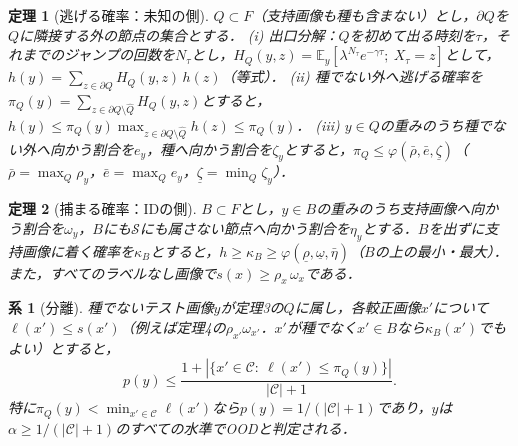 \documentclass[a4paper,10pt,dvipdfmx]{jsarticle}
\newtheorem{theorem}{定理}
\newtheorem{corollary}{系}
\theoremstyle{definition}
\newcommand{\cS}{\mathcal{S}}
\newcommand{\cC}{\mathcal{C}}
\newcommand{\hQ}{\hat{Q}}
\newcommand{\E}{\mathbb{E}}
\begin{document}
\begin{theorem}[逃げる確率：未知の側]
$Q\subset F$（支持画像も種も含まない）とし，$\partial Q$を$Q$に隣接する外の節点の集合とする．
(i) 出口分解：$Q$を初めて出る時刻を$\tau$，それまでのジャンプの回数を$N_\tau$とし，$H_Q(y,z)=\E_y[\lambda^{N_\tau}e^{-\gamma\tau};\ X_\tau=z]$として，$h(y)=\sum_{z\in\partial Q}H_Q(y,z)\,h(z)$（等式）．
(ii) 種でない外へ逃げる確率を$\pi_Q(y)=\sum_{z\in\partial Q\setminus\hQ}H_Q(y,z)$とすると，$h(y)\le\pi_Q(y)\max_{z\in\partial Q\setminus\hQ}h(z)\le\pi_Q(y)$．
(iii) $y\in Q$の重みのうち種でない外へ向かう割合を$e_y$，種へ向かう割合を$\zeta_y$とすると，$\pi_Q\le\varphi(\bar\rho,\bar e,\underline{\zeta})$（$\bar\rho=\max_Q\rho_y$，$\bar e=\max_Qe_y$，$\underline{\zeta}=\min_Q\zeta_y$）．
\end{theorem}

\begin{theorem}[捕まる確率：IDの側]
$B\subset F$とし，$y\in B$の重みのうち支持画像へ向かう割合を$\omega_y$，$B$にも$\cS$にも属さない節点へ向かう割合を$\eta_y$とする．$B$を出ずに支持画像に着く確率を$\kappa_B$とすると，$h\ge\kappa_B\ge\varphi(\underline{\rho},\underline{\omega},\bar\eta)$（$B$の上の最小・最大）．また，すべてのラベルなし画像で$s(x)\ge\rho_x\,\omega_x$である．
\end{theorem}

\begin{corollary}[分離]
種でないテスト画像$y$が定理3の$Q$に属し，各較正画像$x'$について$\ell(x')\le s(x')$（例えば定理4の$\rho_{x'}\omega_{x'}$．$x'$が種でなく$x'\in B$なら$\kappa_B(x')$でもよい）とすると，
\begin{equation}
p(y)\le\frac{1+|\{x'\in\cC:\ \ell(x')\le\pi_Q(y)\}|}{|\cC|+1}.
\label{eq:sep}
\end{equation}
特に$\pi_Q(y)<\min_{x'\in\cC}\ell(x')$なら$p(y)=1/(|\cC|+1)$であり，$y$は$\alpha\ge1/(|\cC|+1)$のすべての水準でOODと判定される．
\end{corollary}
\end{document}
